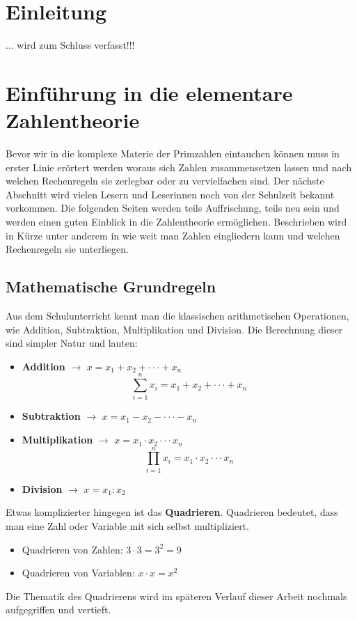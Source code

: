 \documentclass[12pt,a4paper]{article}
\theoremstyle{definition}
\begin{document}
\section*{Einleitung}
... wird zum Schluss verfasst!!!\newpage

\setcounter{section}{0}
\setcounter{page}{1}
\section{Einführung in die elementare Zahlentheorie}
Bevor wir in die komplexe Materie der Primzahlen eintauchen können muss in erster Linie erörtert werden woraus sich Zahlen zusammensetzen lassen und nach welchen Rechenregeln sie zerlegbar oder zu vervielfachen sind.
Der nächste Abschnitt wird vielen Lesern und Leserinnen noch von der Schulzeit bekannt vorkommen.
Die folgenden Seiten werden teils Auffrischung, teils neu sein und werden einen guten Einblick in die Zahlentheorie ermöglichen.
Beschrieben wird in Kürze unter anderem in wie weit man Zahlen eingliedern kann und welchen Rechenregeln sie unterliegen.

\subsection{Mathematische Grundregeln}\label{Mathematische Grundregeln}
Aus dem Schulunterricht kennt man die klassischen arithmetischen Operationen, wie Addition, Subtraktion, Multiplikation und Division.
Die Berechnung dieser sind simpler Natur und lauten:
\begin{itemize}
\item \textbf{Addition} $\to$ $x = x_{1} + x_{2} + \cdot\cdot\cdot + x_{n}$
\[\sum_{i=1}^n x_{i} = x_{1} + x_{2} +  \cdot\cdot\cdot + x_{n}\]

\item \textbf{Subtraktion} $\to$ $x = x_{1} - x_{2} - \cdot\cdot\cdot - x_{n}$

\item \textbf{Multiplikation} $\to$ $x = x_{1} \cdot x_{2} \cdot\cdot\cdot x_{n}$
\[\prod_{i=1}^n x_{i} = x_{1} \cdot x_{2} \cdot\cdot\cdot x_{n}\]

\item \textbf{Division} $\to$ $x = x_{1} : x_{2}$
\end{itemize}

Etwas komplizierter hingegen ist das \textbf{Quadrieren}.
Quadrieren bedeutet, dass man eine Zahl oder Variable mit sich selbst multipliziert.
\begin{itemize}
\item Quadrieren von Zahlen: $3 \cdot 3 = 3^2 = 9$
\item Quadrieren von Variablen: $x \cdot x = x^2$
\end{itemize}
Die Thematik des Quadrierens wird im späteren Verlauf dieser Arbeit nochmals aufgegriffen und vertieft.
\end{document}
